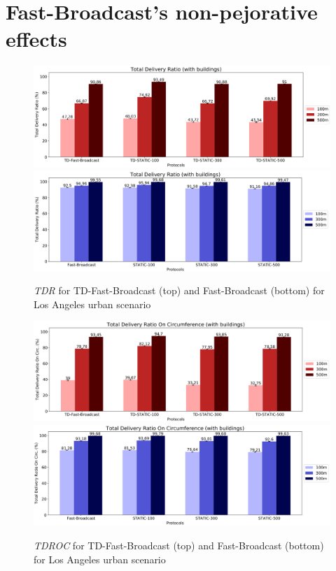 	\section{Fast-Broadcast's non-pejorative effects}
		\begin{figure}[H]
			\centering	
			\includegraphics[width=1.0\textwidth]{immagini/td-fb-la/td-fb/tdr}
			\includegraphics[width=1.0\textwidth]{immagini/td-fb-la/fb/tdr}
			\caption{\textit{TDR} for TD-Fast-Broadcast (top) and Fast-Broadcast (bottom) for Los Angeles urban scenario}
			\label{fig:la-td-tdr}
		\end{figure}
			
		\begin{figure}[H]
			\centering
			\includegraphics[width=1.0\textwidth]{immagini/td-fb-la/td-fb/tdroc}	
			\includegraphics[width=1.0\textwidth]{immagini/td-fb-la/fb/tdroc}
			\caption{\textit{TDROC} for TD-Fast-Broadcast (top) and Fast-Broadcast (bottom) for Los Angeles urban scenario}
			\label{fig:la-td-tdroc}
		\end{figure}
				
